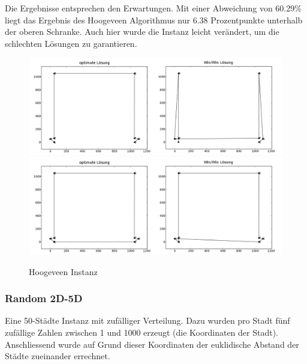 \documentclass[11pt,a4paper]{article}
\begin{document}
Die Ergebnisse entsprechen den Erwartungen. Mit einer Abweichung von 60.29\% liegt das Ergebnis des Hoogeveen Algorithmus nur 6.38 Prozentpunkte unterhalb der oberen Schranke. Auch hier wurde die Instanz leicht verändert, um die schlechten Lösungen zu garantieren.

\begin{figure}[H]
        \centering
        \includegraphics[width=16cm]{gfx/hoogeveen_hpp_comparison}
        \includegraphics[width=16cm]{gfx/hoogeveen_tsp_comparison}
        \caption{Hoogeveen Instanz}
        \label{img:hoogeveen_comparison}
\end{figure}

\subsubsection{Random 2D-5D}
Eine 50-Städte Instanz mit zufälliger Verteilung. Dazu wurden pro Stadt fünf zufällige Zahlen zwischen 1 und 1000 erzeugt (die Koordinaten der Stadt). Anschliessend wurde auf Grund dieser Koordinaten der euklidische Abstand der Städte zueinander errechnet.
\end{document}
